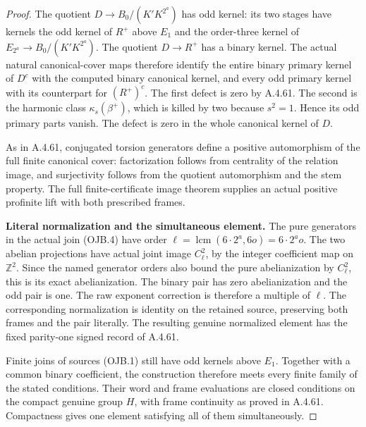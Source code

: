 \begin{proof}
The quotient $D\to B_0/(K'K^{2^a})$ has odd kernel:
its two stages have kernels the odd kernel of $R^+$
above $E_1$ and the order-three kernel of
$E_{2^a}\to B_0/(K'K^{2^a})$.
The quotient $D\to R^+$ has a binary kernel.
The actual natural canonical-cover maps therefore
identify the entire binary primary kernel of $D^c$
with the computed binary canonical kernel, and every
odd primary kernel with its counterpart for $(R^+)^c$.
The first defect is zero by A.4.61. The second is the
harmonic class $\kappa_s(\beta^+)$, which is killed by
two because $s^2=1$. Hence its odd primary parts vanish.
The defect is zero in the whole canonical kernel of $D$.

As in A.4.61, conjugated torsion generators define a
positive automorphism of the full finite canonical cover:
factorization follows from centrality of the relation
image, and surjectivity follows from the quotient
automorphism and the stem property. The full
finite-certificate image theorem supplies an actual
positive profinite lift with both prescribed frames.

\par\medskip\noindent\textbf{Literal normalization and the simultaneous element.}\quad
The pure generators in the actual join (OJB.4) have
order $\ell=\operatorname{lcm}(6\cdot2^a,6o)=6\cdot2^a o$.
The two abelian projections have actual joint image
$C_\ell^2$, by the integer coefficient map on
$\mathbb Z^2$. Since the named generator orders also
bound the pure abelianization by $C_\ell^2$, this is
its exact abelianization.
The binary pair has zero abelianization and the odd
pair is one. The raw exponent correction is therefore
a multiple of $\ell$. The corresponding normalization
is identity on the retained source, preserving both
frames and the pair literally. The resulting genuine
normalized element has the fixed parity-one signed
record of A.4.61.

Finite joins of sources (OJB.1) still have odd kernels
above $E_1$. Together with a common binary coefficient,
the construction therefore meets every finite family
of the stated conditions. Their word and frame
evaluations are closed conditions on the compact
genuine group $H$, with frame continuity as proved in
A.4.61. Compactness gives one element satisfying all
of them simultaneously.
\end{proof}

